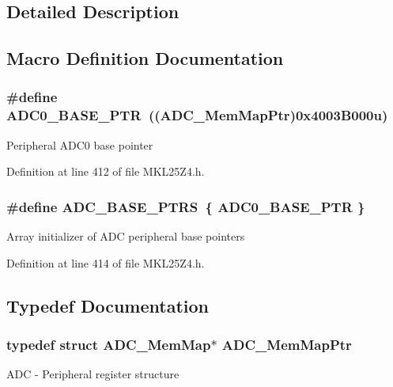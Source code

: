 \subsection{Detailed Description}


\subsection{Macro Definition Documentation}
\subsubsection[{\texorpdfstring{A\+D\+C0\+\_\+\+B\+A\+S\+E\+\_\+\+P\+TR}{ADC0_BASE_PTR}}]{\setlength{\rightskip}{0pt plus 5cm}\#define A\+D\+C0\+\_\+\+B\+A\+S\+E\+\_\+\+P\+TR~(({\bf A\+D\+C\+\_\+\+Mem\+Map\+Ptr})0x4003\+B000u)}\hypertarget{group___a_d_c___peripheral_ga6cec2f227a3a37a9fccaa830740f1f5e}{}\label{group___a_d_c___peripheral_ga6cec2f227a3a37a9fccaa830740f1f5e}
Peripheral A\+D\+C0 base pointer 

Definition at line 412 of file M\+K\+L25\+Z4.\+h.

\subsubsection[{\texorpdfstring{A\+D\+C\+\_\+\+B\+A\+S\+E\+\_\+\+P\+T\+RS}{ADC_BASE_PTRS}}]{\setlength{\rightskip}{0pt plus 5cm}\#define A\+D\+C\+\_\+\+B\+A\+S\+E\+\_\+\+P\+T\+RS~\{ {\bf A\+D\+C0\+\_\+\+B\+A\+S\+E\+\_\+\+P\+TR} \}}\hypertarget{group___a_d_c___peripheral_gaaa8175a3a2f4efaceeed5bd26c0b2d3f}{}\label{group___a_d_c___peripheral_gaaa8175a3a2f4efaceeed5bd26c0b2d3f}
Array initializer of A\+DC peripheral base pointers 

Definition at line 414 of file M\+K\+L25\+Z4.\+h.



\subsection{Typedef Documentation}
\subsubsection[{\texorpdfstring{A\+D\+C\+\_\+\+Mem\+Map\+Ptr}{ADC_MemMapPtr}}]{\setlength{\rightskip}{0pt plus 5cm}typedef struct {\bf A\+D\+C\+\_\+\+Mem\+Map}$\ast$ {\bf A\+D\+C\+\_\+\+Mem\+Map\+Ptr}}\hypertarget{group___a_d_c___peripheral_ga1673c677bf7c0ca339c8563e06de75fa}{}\label{group___a_d_c___peripheral_ga1673c677bf7c0ca339c8563e06de75fa}
A\+DC -\/ Peripheral register structure 